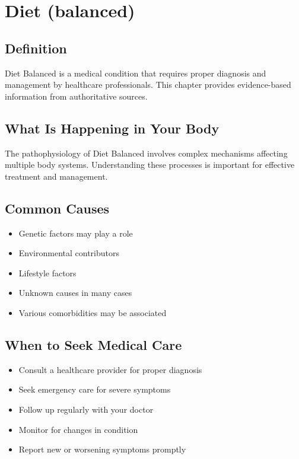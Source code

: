
\chapter{Diet (balanced)}

\section*{Definition}
Diet Balanced is a medical condition that requires proper diagnosis and management by healthcare professionals. This chapter provides evidence-based information from authoritative sources.

\section*{What Is Happening in Your Body}
The pathophysiology of Diet Balanced involves complex mechanisms affecting multiple body systems. Understanding these processes is important for effective treatment and management.

\section*{Common Causes}
\begin{itemize}
  \item Genetic factors may play a role
  \item Environmental contributors
  \item Lifestyle factors
  \item Unknown causes in many cases
  \item Various comorbidities may be associated
\end{itemize}

\section*{When to Seek Medical Care}
\begin{itemize}
  \item Consult a healthcare provider for proper diagnosis
  \item Seek emergency care for severe symptoms
  \item Follow up regularly with your doctor
  \item Monitor for changes in condition
  \item Report new or worsening symptoms promptly
\end{itemize}

